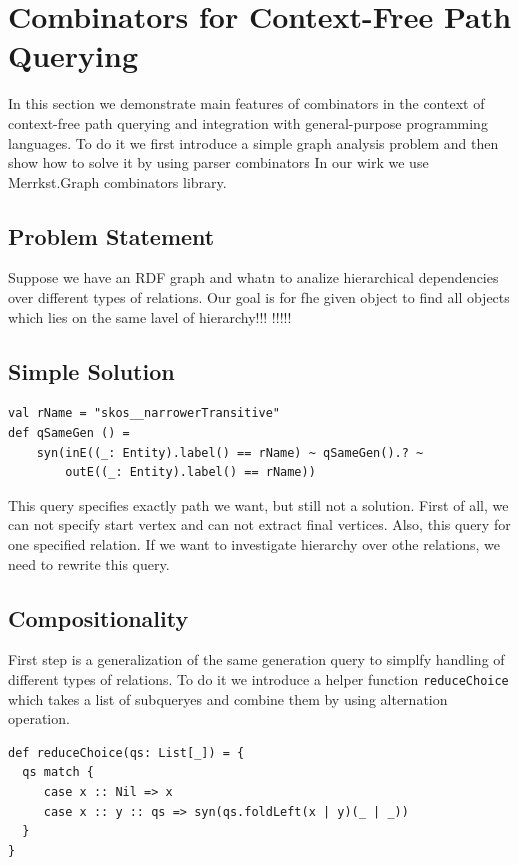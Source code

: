 \section{Combinators for Context-Free Path Querying}

In this section we demonstrate main features of combinators in the context of context-free path querying and integration with general-purpose programming languages.
To do it we first introduce a simple graph analysis problem and then show how to solve it by using parser combinators
In our wirk we use Merrkst.Graph combinators library.

\subsection{Problem Statement}
Suppose we have an RDF graph and whatn to analize hierarchical dependencies over different types of relations.
Our goal is for fhe given object to find all objects which lies on the same lavel of hierarchy!!!
!!!!!

\subsection{Simple Solution}

\begin{lstlisting}
val rName = "skos__narrowerTransitive"
def qSameGen () =
    syn(inE((_: Entity).label() == rName) ~ qSameGen().? ~
        outE((_: Entity).label() == rName))
\end{lstlisting}

This query specifies exactly path we want, but still not a solution.
First of all, we can not specify start vertex and can not extract final vertices.
Also, this query for one specified relation.
If we want to investigate hierarchy over othe relations, we need to rewrite this query.

\subsection{Compositionality}

First step is a generalization of the same generation query to simplfy handling of different types of relations.
To do it we introduce a helper function \verb|reduceChoice| which takes a list of subqueryes and combine them by using alternation operation.

\begin{lstlisting}
def reduceChoice(qs: List[_]) = {
  qs match {
     case x :: Nil => x
     case x :: y :: qs => syn(qs.foldLeft(x | y)(_ | _))
  }
}
\end{lstlisting}

